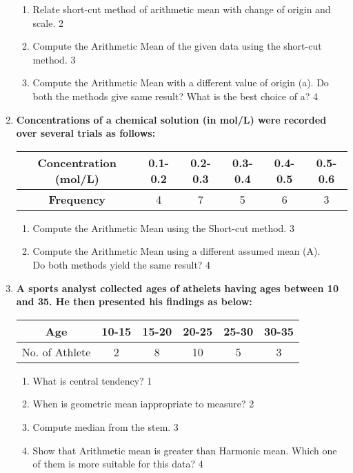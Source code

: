 \documentclass[a4paper,oneside]{book}
\begin{document}
\begin{enumerate}
    \begin{enumerate}
    \item
	Relate short-cut method of arithmetic mean with change of origin and scale. \hfill 2
    \item  
	Compute the Arithmetic Mean of the given data using the short-cut method. \hfill 3
    \item
	Compute the Arithmetic Mean with a different value of origin (a). Do both the methods give same result? What is the best choice of a? \hfill 4
  \end{enumerate}
  
  \item
\textbf{Concentrations of a chemical solution (in mol/L) were recorded over 
several trials as follows:} 

\begin{table}[h]
\centering
\begin{tabular}{c|ccccc}
\textbf{Concentration (mol/L)} & 0.1-0.2 & 0.2-0.3 & 0.3-0.4 & 0.4-0.5 & 0.5-0.6 \\ \hline
\textbf{Frequency}             & 4       & 7       & 5       & 6       & 3       
\end{tabular}
\end{table}

\begin{enumerate}
    \item  
    Compute the Arithmetic Mean using the Short-cut method. \hfill 3
    \item
    Compute the Arithmetic Mean using a different assumed mean (A). \\
    Do both methods yield the same result? \hfill 4
\end{enumerate}

  
     \item
	  \textbf{A sports analyst collected ages of athelets having ages between 10 and 35. He then presented his findings as below:} 
	  
	  \begin{table}[h]
	    \centering
\begin{tabular}{c|c|c|c|c|c}
Age            & 10-15 & 15-20 & 20-25 & 25-30 & 30-35 \\ \hline
No. of Athlete & 2     & 8     & 10    & 5     & 3    
\end{tabular}
\end{table}
  
  \begin{enumerate}
    \item
	What is central tendency? \hfill 1
    \item
	When is geometric mean iappropriate to measure? \hfill 2
    \item  
	Compute median from the stem. \hfill 3
    \item
	Show that Arithmetic mean is greater than Harmonic mean. Which one of them is more suitable for this data? \hfill 4
  \end{enumerate}


\end{enumerate}
\end{document}
